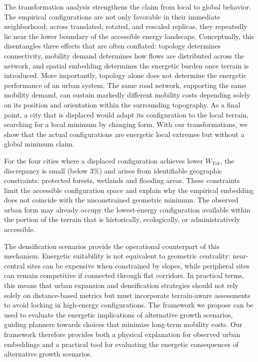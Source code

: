 \documentclass[twocolumn,amsmath,amssymb,floatfix,nature,shownopacs,footinbib,superscriptaddress]{revtex4-2}
\begin{document}
The transformation analysis strengthens the claim from local to global behavior. The empirical configurations are not only favorable in their immediate neighborhood; across translated, rotated, and rescaled replicas, they repeatedly lie near the lower boundary of the accessible energy landscape. Conceptually, this disentangles three effects that are often conflated: topology determines connectivity, mobility demand determines how flows are distributed across the network,
and spatial embedding determines the energetic burden once terrain is introduced. More importantly, topology alone does not determine the energetic performance of an urban system. The same road network, supporting the same mobility demand, can sustain markedly different mobility costs depending solely on its position and orientation within the surrounding topography. As a final point, a city that is displaced would adapt its configuration to the local terrain, searching for a local minimum by changing form. With our transformations, we show that the actual configurations are energetic local extremes but without a global minimum claim. 

For the four cities where a displaced configuration achieves lower $W_{\mathrm{Tot}}$, the discrepancy is small (below $3\%$) and arises from identifiable geographic constraints: protected forests, wetlands and flooding areas. These constraints limit the accessible configuration space and explain why the empirical embedding does not coincide with the unconstrained geometric minimum. The observed urban form may already occupy the lowest-energy configuration available within the portion of the terrain that is historically, ecologically, or administratively accessible.

The densification scenarios provide the operational counterpart of this mechanism. Energetic suitability is not equivalent to geometric centrality: near-central sites can be expensive when constrained by slopes, while peripheral sites can remain competitive if connected through flat corridors. In practical terms, this means that urban expansion and densification strategies should not rely solely on distance-based metrics but must incorporate terrain-aware assessments to avoid locking in high-energy configurations. The framework we propose can be used to evaluate the energetic implications of alternative growth scenarios, guiding planners towards choices that minimize long-term mobility costs. Our framework therefore provides both a physical explanation for observed urban embeddings and a practical tool for evaluating the energetic consequences of alternative growth scenarios.
\end{document}
